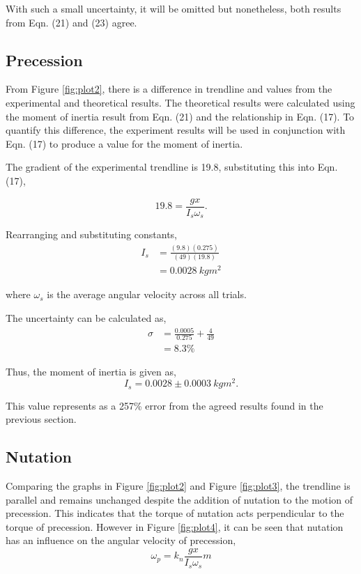 \documentclass{article}
\begin{document}
With such a small uncertainty, it will be omitted but nonetheless, both results from Eqn. 
(21) and (23) agree.

\subsection{Precession}
From Figure \ref{fig:plot2}, there is a difference in trendline and values from the
experimental and theoretical results. The theoretical results were calculated using
the moment of inertia result from Eqn. (21) and the relationship in Eqn. (17). To 
quantify this difference, the experiment results will be used in conjunction with 
Eqn. (17) to produce a value for the moment of inertia.

The gradient of the experimental trendline is 19.8, substituting this into Eqn. (17),

\begin{equation}
    19.8 = \frac{gx}{I_s \omega_s}.
\end{equation}

Rearranging and substituting constants,
\begin{equation}
    \begin{split}
        I_s &= \frac{(9.8)(0.275)}{(49)(19.8)} \\
        &= 0.0028 \: kgm^2
    \end{split}
\end{equation}

where $\omega_s$ is the average angular velocity across all trials.

The uncertainty can be calculated as,
\begin{equation}
    \begin{split}
        \sigma &= \frac{0.0005}{0.275}+\frac{4}{49} \\
        &= 8.3\%
    \end{split}
\end{equation}

Thus, the moment of inertia is given as,
\begin{equation}
    I_s = 0.0028 \pm 0.0003 \: kgm^2.
\end{equation}

This value represents as a 257\% error from the agreed results found in the previous 
section.

\subsection{Nutation}
Comparing the graphs in Figure \ref{fig:plot2} and Figure \ref{fig:plot3}, the trendline
is parallel and remains unchanged despite the addition of nutation to the motion of 
precession. This indicates that the torque of nutation acts perpendicular to the torque
of precession. However in Figure \ref{fig:plot4}, it can be seen that nutation has an
influence on the angular velocity of precession, 
\begin{equation}
    \omega_p = k_n\frac{gx}{I_s\omega_s}m
\end{equation}
\end{document}

